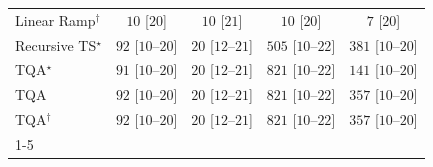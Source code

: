 \begin{tabular}{l|cccc|}
Linear Ramp$^\dagger$ & {\cellcolor[HTML]{F7FCF5}} \color[HTML]{000000} $10$ [$20$] & {\cellcolor[HTML]{F7FCF5}} \color[HTML]{000000} $10$ [$21$] & {\cellcolor[HTML]{F7FCF5}} \color[HTML]{000000} $10$ [$20$] & {\cellcolor[HTML]{F7FCF5}} \color[HTML]{000000} $7$ [$20$] \\
Recursive TS$^\star$ & {\cellcolor[HTML]{E8F6E4}} \color[HTML]{000000} $92$ [$10$--$20$] & {\cellcolor[HTML]{F5FBF2}} \color[HTML]{000000} $20$ [$12$--$21$] & {\cellcolor[HTML]{48AE60}} \color[HTML]{F1F1F1} $505$ [$10$--$22$] & {\cellcolor[HTML]{84CC83}} \color[HTML]{000000} $381$ [$10$--$20$] \\
TQA$^\star$ & {\cellcolor[HTML]{E8F6E4}} \color[HTML]{000000} $91$ [$10$--$20$] & {\cellcolor[HTML]{F5FBF2}} \color[HTML]{000000} $20$ [$12$--$21$] & {\cellcolor[HTML]{00451C}} \color[HTML]{F1F1F1} $821$ [$10$--$22$] & {\cellcolor[HTML]{DCF2D7}} \color[HTML]{000000} $141$ [$10$--$20$] \\
TQA & {\cellcolor[HTML]{E8F6E4}} \color[HTML]{000000} $92$ [$10$--$20$] & {\cellcolor[HTML]{F5FBF2}} \color[HTML]{000000} $20$ [$12$--$21$] & {\cellcolor[HTML]{00451C}} \color[HTML]{F1F1F1} $821$ [$10$--$22$] & {\cellcolor[HTML]{8ED08B}} \color[HTML]{000000} $357$ [$10$--$20$] \\
TQA$^\dagger$ & {\cellcolor[HTML]{E8F6E4}} \color[HTML]{000000} $92$ [$10$--$20$] & {\cellcolor[HTML]{F5FBF2}} \color[HTML]{000000} $20$ [$12$--$21$] & {\cellcolor[HTML]{00451C}} \color[HTML]{F1F1F1} $821$ [$10$--$22$] & {\cellcolor[HTML]{8ED08B}} \color[HTML]{000000} $357$ [$10$--$20$] \\
\cline{1-5}
\bottomrule
\end{tabular}
